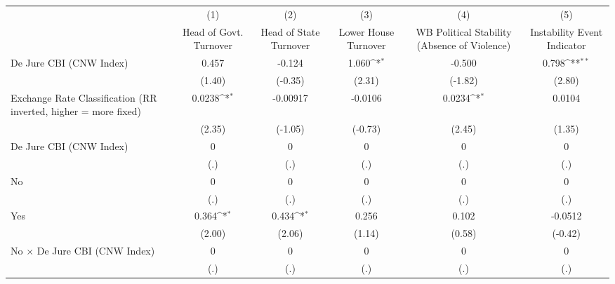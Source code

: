 {
\def\sym#1{\ifmmode^{#1}\else\(^{#1}\)\fi}
\begin{tabular*}{\linewidth}{@{\hskip\tabcolsep\extracolsep\fill}l*{5}{c}}
\toprule
                &\multicolumn{1}{c}{(1)}&\multicolumn{1}{c}{(2)}&\multicolumn{1}{c}{(3)}&\multicolumn{1}{c}{(4)}&\multicolumn{1}{c}{(5)}\\
                &\multicolumn{1}{c}{Head of Govt. Turnover}&\multicolumn{1}{c}{Head of State Turnover}&\multicolumn{1}{c}{Lower House Turnover}&\multicolumn{1}{c}{WB Political Stability (Absence of Violence)}&\multicolumn{1}{c}{Instability Event Indicator}\\
\midrule
De Jure CBI (CNW Index)&    0.457         &   -0.124         &    1.060\sym{*}  &   -0.500         &    0.798\sym{**} \\
                &   (1.40)         &  (-0.35)         &   (2.31)         &  (-1.82)         &   (2.80)         \\
\addlinespace
Exchange Rate Classification (RR inverted, higher = more fixed)&   0.0238\sym{*}  & -0.00917         &  -0.0106         &   0.0234\sym{*}  &   0.0104         \\
                &   (2.35)         &  (-1.05)         &  (-0.73)         &   (2.45)         &   (1.35)         \\
\addlinespace
De Jure CBI (CNW Index)&        0         &        0         &        0         &        0         &        0         \\
                &      (.)         &      (.)         &      (.)         &      (.)         &      (.)         \\
\addlinespace
No              &        0         &        0         &        0         &        0         &        0         \\
                &      (.)         &      (.)         &      (.)         &      (.)         &      (.)         \\
\addlinespace
Yes             &    0.364\sym{*}  &    0.434\sym{*}  &    0.256         &    0.102         &  -0.0512         \\
                &   (2.00)         &   (2.06)         &   (1.14)         &   (0.58)         &  (-0.42)         \\
\addlinespace
No $\times$ De Jure CBI (CNW Index)&        0         &        0         &        0         &        0         &        0         \\
                &      (.)         &      (.)         &      (.)         &      (.)         &      (.)         \\

\end{tabular*}}
